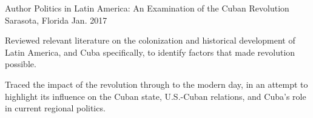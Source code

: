 \begin{cventries}
    \cventry
      {Author} %
      {Politics in Latin America: An Examination of the Cuban Revolution} %
      {Sarasota, Florida} %
      {Jan. 2017} %
      {
        \begin{cvitems} %
          \item {Reviewed relevant literature on the colonization and historical development of Latin America, and Cuba specifically, to identify factors that made revolution possible.}
          \item {Traced the impact of the revolution through to the modern day, in an attempt to highlight its influence on the Cuban state, U.S.-Cuban relations, and Cuba's role in current regional politics.}
        \end{cvitems}
      }


\end{cventries}
